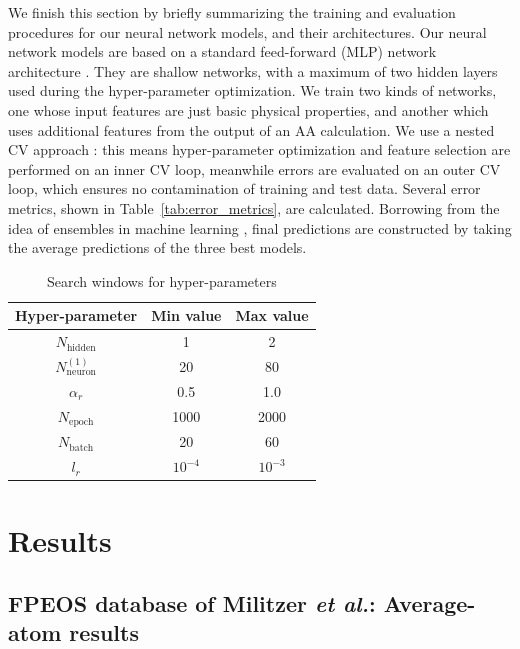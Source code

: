 \documentclass[%
 preprint,
 superscriptaddress,
 amsmath,amssymb,
longbibliography,
]{revtex4-2}
\begin{document}
We finish this section by briefly summarizing the training and evaluation procedures for our neural network models, and their architectures. Our neural network models are based on a standard feed-forward (MLP) network architecture \cite{Rumelhart1986}. They are shallow networks, with a maximum of two hidden layers used during the hyper-parameter optimization. We train two kinds of networks, one whose input features are just basic physical properties, and another which uses additional features from the output of an AA calculation. We use a nested CV approach \cite{hastie_stats}: this means hyper-parameter optimization and feature selection are performed on an inner CV loop, meanwhile errors are evaluated on an outer CV loop, which ensures no contamination of training and test data. Several error metrics, shown in Table~\ref{tab:error_metrics}, are calculated. Borrowing from the idea of ensembles in machine learning \cite{Kittler1998}, final predictions are constructed by taking the average predictions of the three best models. 

\begin{table}[]
    \centering
    \begin{tabular}{ccc}
        \toprule
         Hyper-parameter & Min value & Max value \\ \midrule
         $N_\textrm{hidden}$ & 1 & 2 \\ 
         $N_\textrm{neuron}^{(1)}$ & 20 & 80 \\
         $\alpha_r$ & 0.5 & 1.0 \\
         $N_\textrm{epoch}$ & 1000 & 2000 \\
         $N_\textrm{batch}$ & 20 & 60 \\
         $l_r$ & $10^{-4}$ & $10^{-3}$ \\ \bottomrule
    \end{tabular}
    \caption{Search windows for hyper-parameters}
    \label{tab:hyperparam_search}
\end{table}

\section{Results}\label{sec:results}

\subsection{FPEOS database of Militzer \emph{et al.}: Average-atom results}
\end{document}
